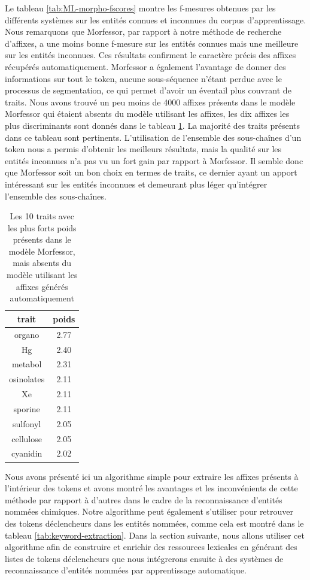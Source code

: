 \documentclass[12pt,a4paper,times,twoside,openright]{report}
\begin{document}
Le tableau \ref{tab:ML-morpho-fscores} montre les f-mesures obtenues par les différents systèmes sur les entités connues et inconnues du corpus d'apprentissage. Nous remarquons que Morfessor, par rapport à notre méthode de recherche d'affixes, a une moins bonne f-mesure sur les entités connues mais une meilleure sur les entités inconnues. Ces résultats confirment le caractère précis des affixes récupérés automatiquement. Morfessor a également l'avantage de donner des informations sur tout le token, aucune sous-séquence n'étant perdue avec le processus de segmentation, ce qui permet d'avoir un éventail plus couvrant de traits. Nous avons trouvé un peu moins de 4000 affixes présents dans le modèle Morfessor qui étaient absents du modèle utilisant les affixes, les dix affixes les plus discriminants sont donnés dans le tableau \ref{tab:only-morfessor}. La majorité des traits présents dans ce tableau sont pertinents. L'utilisation de l'ensemble des sous-chaînes d'un token nous a permis d'obtenir les meilleurs résultats, mais la qualité sur les entités inconnues n'a pas vu un fort gain par rapport à Morfessor. Il semble donc que Morfessor soit un bon choix en termes de traits, ce dernier ayant un apport intéressant sur les entités inconnues et demeurant plus léger qu'intégrer l'ensemble des sous-chaînes.

\begin{table}
\centering
\begin{tabular}{|c|c|}
\hline
trait & poids \\
\hline
organo & 2.77 \\
Hg & 2.40 \\
metabol & 2.31 \\
osinolates & 2.11 \\
Xe & 2.11 \\
sporine & 2.11 \\
sulfonyl & 2.05 \\
cellulose & 2.05 \\
cyanidin & 2.02 \\
\hline
\end{tabular}
\caption{Les 10 traits avec les plus forts poids présents dans le modèle Morfessor, mais absents du modèle utilisant les affixes générés automatiquement}
\label{tab:only-morfessor}
\end{table}

Nous avons présenté ici un algorithme simple pour extraire les affixes présents à l'intérieur des tokens et avons montré les avantages et les inconvénients de cette méthode par rapport à d'autres dans le cadre de la reconnaissance d'entités nommées chimiques. Notre algorithme peut également s'utiliser pour retrouver des tokens déclencheurs dans les entités nommées, comme cela est montré dans le tableau \ref{tab:keyword-extraction}. Dans la section suivante, nous allons utiliser cet algorithme afin de construire et enrichir des ressources lexicales en générant des listes de tokens déclencheurs que nous intégrerons ensuite à des systèmes de reconnaissance d'entités nommées par apprentissage automatique.
\end{document}
